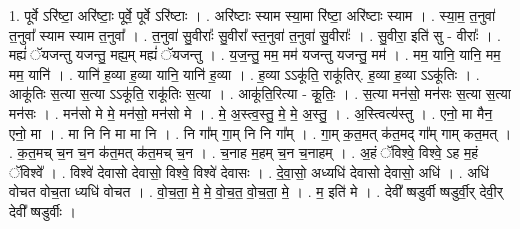 \documentclass[17pt]{extarticle}
\begin{document}
1. पूर्वे ऽरि॑ष्टा॒ अरि॑ष्टाः॒ पूर्वे॒ पूर्वे ऽरि॑ष्टाः । . अरि॑ष्टाः स्याम स्या॒मा रि॑ष्टा॒ अरि॑ष्टाः स्याम । . स्या॒म॒ त॒नुवा॑ त॒नुवा᳚ स्याम स्याम त॒नुवा᳚ । . त॒नुवा॑ सु॒वीराः᳚ सु॒वीरा᳚ स्त॒नुवा॑ त॒नुवा॑ सु॒वीराः᳚ । . सु॒वीरा॒ इति॑ सु - वीराः᳚ । . मह्यं॑ ॅयजन्तु यजन्तु॒ मह्य॒म् मह्यं॑ ॅयजन्तु । . य॒ज॒न्तु॒ मम॒ मम॑ यजन्तु यजन्तु॒ मम॑ । . मम॒ यानि॒ यानि॒ मम॒ मम॒ यानि॑ । . यानि॑ ह॒व्या ह॒व्या यानि॒ यानि॑ ह॒व्या । . ह॒व्या ऽऽकू॑ति॒ राकू॑तिर्. ह॒व्या ह॒व्या ऽऽकू॑तिः । . आकू॑तिः स॒त्या स॒त्या ऽऽकू॑ति॒ राकू॑तिः स॒त्या । . आकू॑ति॒रित्या - कू॒तिः॒ । . स॒त्या मन॑सो॒ मन॑सः स॒त्या स॒त्या मन॑सः । . मन॑सो मे मे॒ मन॑सो॒ मन॑सो मे । . मे॒ अ॒स्त्व॒स्तु॒ मे॒ मे॒ अ॒स्तु॒ । . अ॒स्त्वित्य॑स्तु । . एनो॒ मा मैन॒ एनो॒ मा । . मा नि नि मा मा नि । . नि गा᳚म् गा॒म् नि नि गा᳚म् । . गा॒म् क॒त॒मत् क॑त॒मद् गा᳚म् गाम् कत॒मत् । . क॒त॒मच् च॒न च॒न क॑त॒मत् क॑त॒मच् च॒न । . च॒नाह म॒हम् च॒न च॒नाहम् । . अ॒हं ॅविश्वे॒ विश्वे॒ ऽह म॒हं ॅविश्वे᳚ । . विश्वे॑ देवासो देवासो॒ विश्वे॒ विश्वे॑ देवासः । . दे॒वा॒सो॒ अध्यधि॑ देवासो देवासो॒ अधि॑ । . अधि॑ वोचत वोच॒ता ध्यधि॑ वोचत । . वो॒च॒ता॒ मे॒ मे॒ वो॒च॒त॒ वो॒च॒ता॒ मे॒ । . म॒ इति॑ मे । . देवी᳚ ष्षडुर्वी ष्षडुर्वी॒र् देवी॒र् देवी᳚ ष्षडुर्वीः । \newline
\end{document}
